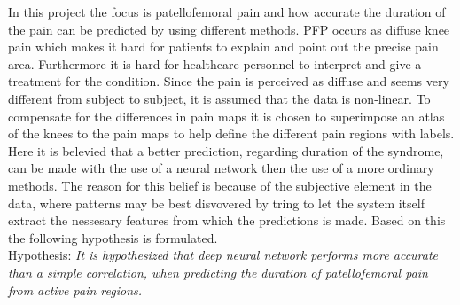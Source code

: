 
In this project the focus is patellofemoral pain and how accurate the duration of the pain can be predicted by using different methods. PFP occurs as diffuse knee pain which makes it hard for patients to explain and point out the precise pain area. Furthermore it is hard for healthcare personnel to interpret and give a treatment for the condition. 
Since the pain is perceived as diffuse and seems very different from subject to subject, it is assumed that the data is non-linear. 
To compensate for the differences in pain maps it is chosen to superimpose an atlas of the knees to the pain maps to help define the different pain regions with labels. 
Here it is belevied that a better prediction, regarding duration of the syndrome, can be made with the use of a neural network then the use of a more ordinary methods. The reason for this belief is because of the subjective element in the data, where patterns may be best disvovered by tring to let the system itself extract the nessesary features from which the predictions is made.    
Based on this the following hypothesis is formulated.\\

\noindent
Hypothesis: \textit{It is hypothesized that deep neural network performs more accurate than a simple correlation, when predicting the duration of patellofemoral pain from active pain regions.}
